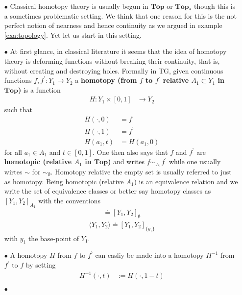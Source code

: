 \begin{enumerate}
\item[$\bullet$]
Classical homotopy theory is usually begun in $\mathbf{Top}$ or $\mathbf{Top}_{\ast}$ though this is a sometimes problematic setting. We think that one reason for this is the not perfect notion of nearness and hence continuity as we argued in example \ref{exa:topology}. Yet let us start in this setting.
\item[$\bullet$]
At first glance, in classical literature it seems that the idea of homotopy theory is deforming functions without breaking their continuity, that is, without creating and destroying {\glqq}holes{\grqq}. Formally in TG, given continuous functions $f,f^{\backprime} \colon Y_{1} \rightarrow Y_{2}$ a \textbf{homotopy (from $f$ to $f^{\backprime}$ relative $A_{1} \subset Y_{1}$ in $\mathbf{Top}$)} is a function
\begin{align*}
  H
  \colon
  Y_{1}
  \times
  [0,1]
  &\rightarrow
  Y_{2}
\end{align*}
such that
\begin{align*}
  H(\cdot,0)
  &=
  f
  \\
  H(\cdot,1)
  &=
  f^{\backprime}
  \\
  H(a_{1},t)
  &=
  H(a_{1},0)
\end{align*}
for all $a_{1} \in A_{1}$ and $t \in [0,1]$. One then also says that $f$ and $f^{\backprime}$ are \textbf{homotopic (relative $A_{1}$ in $\mathbf{Top}$)} and writes $f \sim_{A_{1}} f^{\backprime}$ while one usually wirtes $\sim$ for $\sim_{\emptyset}$. Homotopy relative the empty set is usually referred to just as homotopy. Being homotopic (relative $A_{1}$) is an equivalence relation and we write the set of equivalence classes or better say homotopy classes as $[Y_{1},Y_{2}]_{A_{1}}$ with the conventions
\begin{align*}
  [Y_{1},Y_{2}]
  \doteq
  [Y_{1},Y_{2}]_{\emptyset}
\end{align*}
\begin{align*}
  \langle
    Y_{1},
    Y_{2}
  \rangle
  \doteq
  [Y_{1},Y_{2}]_{\lbrace y_{1} \rbrace}
\end{align*}
with $y_{1}$ the base-point of $Y_{1}$.
\item[$\bullet$]
A homotopy $H$ from $f$ to $f^{\backprime}$ can easliy be made into a homotopy $H^{-1}$ from $f^{\backprime}$ to $f$ by setting
\begin{align*}
  H^{-1}(\cdot,t)
  &:=
  H(\cdot,1-t)
\end{align*}
\item[$\bullet$]

\end{enumerate}
